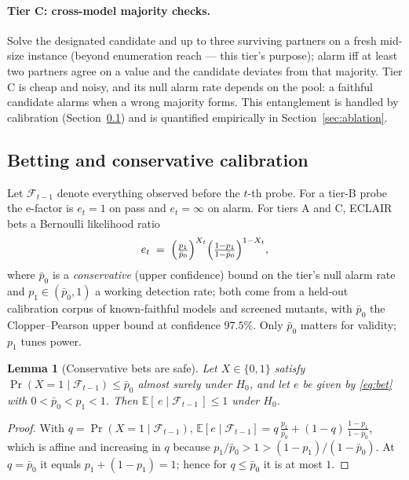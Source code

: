\documentclass[pdflatex,sn-mathphys-num]{sn-jnl}
\theoremstyle{thmstyleone}
\newtheorem{lemma}[theorem]{Lemma}
\theoremstyle{thmstyletwo}
\newcommand{\Filt}{\mathcal{F}}
\newcommand{\HO}{H_0}
\begin{document}
\paragraph{Tier C: cross-model majority checks.}
Solve the designated candidate and up to three surviving partners on
a fresh mid-size instance (beyond enumeration reach --- this tier's
purpose); alarm iff at least two partners agree on a value and the
candidate deviates from that majority. Tier C is cheap and noisy, and
its null alarm rate depends on the pool: a faithful candidate alarms
when a wrong majority forms. This entanglement is handled by
calibration (Section~\ref{sec:calibration}) and is quantified
empirically in Section~\ref{sec:ablation}.

\subsection{Betting and conservative calibration}\label{sec:calibration}

Let $\Filt_{t-1}$ denote everything observed before the $t$-th probe.
For a tier-B probe the e-factor is $e_t = 1$ on pass and
$e_t = \infty$ on alarm. For tiers A and C, ECLAIR bets a Bernoulli
likelihood ratio
\begin{equation}\label{eq:bet}
e_t \;=\;
\Bigl(\tfrac{p_1}{\bar p_0}\Bigr)^{X_t}
\Bigl(\tfrac{1-p_1}{1-\bar p_0}\Bigr)^{1-X_t},
\end{equation}
where $\bar p_0$ is a \emph{conservative} (upper confidence) bound on
the tier's null alarm rate and $p_1 \in (\bar p_0, 1)$ a working
detection rate; both come from a held-out calibration corpus of
known-faithful models and screened mutants, with $\bar p_0$ the
Clopper--Pearson upper bound \cite{clopper1934use} at confidence
$97.5\%$. Only $\bar p_0$ matters for validity; $p_1$ tunes power.

\begin{lemma}[Conservative bets are safe]\label{lem:conservative}
Let $X \in \{0,1\}$ satisfy
$\Pr(X = 1 \mid \Filt_{t-1}) \le \bar p_0$ almost surely under
$\HO$, and let $e$ be given by \eqref{eq:bet} with
$0 < \bar p_0 < p_1 < 1$. Then
$\mathbb{E}[\,e \mid \Filt_{t-1}\,] \le 1$ under $\HO$.
\end{lemma}

\begin{proof}
With $q = \Pr(X{=}1 \mid \Filt_{t-1})$,
$\mathbb{E}[e \mid \Filt_{t-1}]
= q\,\frac{p_1}{\bar p_0} + (1-q)\,\frac{1-p_1}{1-\bar p_0}$,
which is affine and increasing in $q$ because
$p_1/\bar p_0 > 1 > (1-p_1)/(1-\bar p_0)$. At $q = \bar p_0$ it equals
$p_1 + (1-p_1) = 1$; hence for $q \le \bar p_0$ it is at most $1$.
\end{proof}
\end{document}
